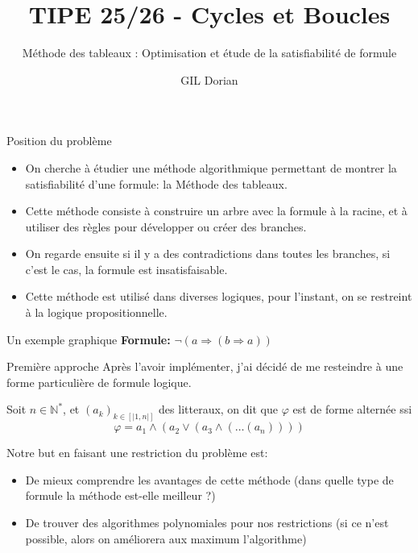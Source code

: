 \documentclass[]{beamer}
\title{TIPE 25/26 - Cycles et Boucles}
\author{GIL Dorian}
\subtitle{Méthode des tableaux : Optimisation et étude de la satisfiabilité de formule}
\date{}
\begin{document}
\begin{frame}
\titlepage
\end{frame}

\begin{frame}{Position du problème}
    \begin{itemize}[<+->]
        \item On cherche à étudier une méthode algorithmique permettant de montrer la satisfiabilité d'une formule: la Méthode des tableaux.
        \item Cette méthode consiste à construire un arbre avec la formule à la racine, et à utiliser des règles pour développer ou créer des branches.
        \item On regarde ensuite si il y a des contradictions dans toutes les branches, si c'est le cas, la formule est insatisfaisable.
        \item Cette méthode est utilisé dans diverses logiques, pour l'instant, on se restreint à la logique propositionnelle.
    \end{itemize}
\end{frame}

\begin{frame}{Un exemple graphique}
    \textbf{Formule:} $\lnot(a \Rightarrow (b \Rightarrow a))$

    \begin{center}
    \end{center}
\end{frame}

\begin{frame}{Première approche}
    Après l'avoir implémenter, j'ai décidé de me resteindre à une forme particulière de formule logique.
    \begin{definition}
        Soit $n\in\mathbb{N}^*$, et $(a_k)_{k\in [|1,n|]}$ des litteraux, on dit que $\varphi$ est de forme alternée ssi
        $$\varphi = a_1\land(a_2\lor(a_3\land(\dots(a_n))))$$
    \end{definition}
    Notre but en faisant une restriction du problème est:
    \begin{itemize}
        \item De mieux comprendre les avantages de cette méthode (dans quelle type de formule la méthode est-elle meilleur ?)
        \item De trouver des algorithmes polynomiales pour nos restrictions (si ce n'est possible, alors on améliorera aux maximum l'algorithme)
    \end{itemize}
\end{frame}
\end{document}
